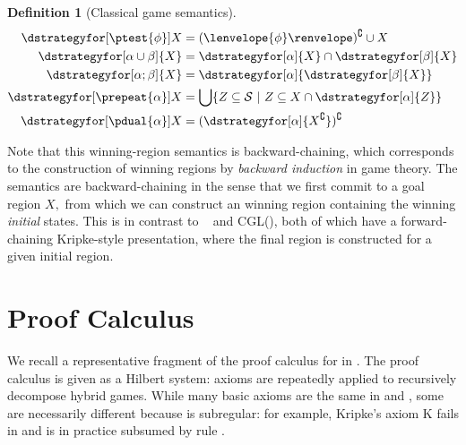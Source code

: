 \documentclass[12pt]{cmuthesis}
\theoremstyle{definition}
\newtheorem{definition}{Definition}
\theoremstyle{remark}
\newcommand{\rref}[2][]{\prettyref{#2}}
\newcommand{\allstate}{\mathcal{S}}
\newcommand{\CGL}{\textsf{CGL}\xspace}
\newcommand{\fint}[1]{\lenvelope{#1}\renvelope}
\begin{document}
\begin{definition}[Classical game semantics]
\begin{align*}
\dstrategyfor[\ptest{\phi}]{X}         &= (\fint{\phi})^\complement \cup X\\
\dstrategyfor[\alpha\cup\beta]{X}   &= \dstrategyfor[\alpha]{X} \cap \dstrategyfor[\beta]{X}\\
\dstrategyfor[\alpha;\beta]{X}      &=  \dstrategyfor[\alpha]{\dstrategyfor[\beta]{X}}\\
\dstrategyfor[\prepeat{\alpha}]{X}  &= \bigcup\{Z \subseteq \allstate~|~ Z \subseteq X \cap \dstrategyfor[\alpha]{Z}\}\\
\dstrategyfor[\pdual{\alpha}]{X}    &= (\dstrategyfor[\alpha]{X^\complement})^\complement
\end{align*}
\end{definition}
Note that this winning-region semantics is backward-chaining, which corresponds to the construction of winning regions by \emph{backward induction} in game theory.
The semantics are backward-chaining in the sense that we first commit to a goal region $X,$ from which we can construct an winning region containing the winning \emph{initial} states.
This is in contrast to \dL~\cite{DBLP:books/sp/Platzer18} and \CGL (\rref{ch:cgl}), both of which have a forward-chaining Kripke-style presentation, where the final region is constructed for a given initial region.

\section{Proof Calculus}
We recall a representative fragment of the proof calculus for \dGL in \rref{fig:dgl-axioms}.
The proof calculus is given as a Hilbert system: axioms are repeatedly applied to recursively decompose hybrid games.
While many basic axioms are the same in \dL and \dGL, some are necessarily different because \dGL is subregular: for example, Kripke's axiom K fails in \dGL and is in practice subsumed by rule .
\end{document}
